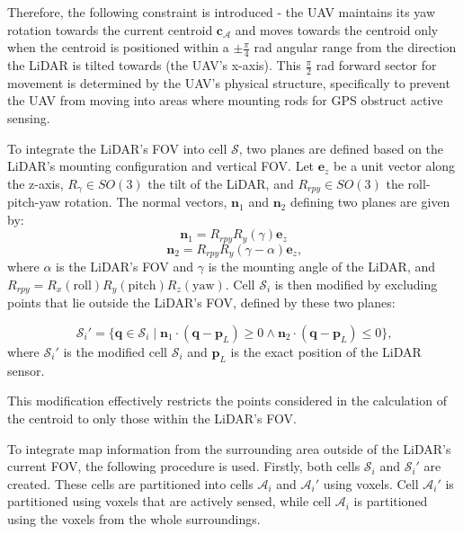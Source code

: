             Therefore, the following constraint is introduced - the \ac{UAV} maintains its yaw rotation towards the current centroid $\mathbf{c}_{\mathcal{A}}$ and moves towards the centroid only when the centroid is positioned within a $\pm \frac{\pi}{4}$ rad angular range from the direction the \ac{LiDAR} is tilted towards (the \ac{UAV}'s x-axis).
            This $\frac{\pi}{2}$ rad forward sector for movement is determined by the \ac{UAV}'s physical structure, specifically to prevent the \ac{UAV} from moving into areas where mounting rods for \ac{GPS} obstruct active sensing.

            To integrate the \ac{LiDAR}'s \ac{FOV} into cell $\mathcal{S}$, two planes are defined based on the \ac{LiDAR}'s mounting configuration and vertical \ac{FOV}.
            Let $\mathbf{e}_z$ be a unit vector along the z-axis, $R_{\gamma} \in SO(3)$ the tilt of the \ac{LiDAR}, and $R_{rpy} \in SO(3)$ the roll-pitch-yaw rotation.
            The normal vectors, $\mathbf{n}_1$ and $\mathbf{n}_2$ defining two planes are given by:
            \begin{equation}
                \mathbf{n}_1 = R_{rpy} R_{y}(\gamma)  \mathbf{e}_z    
            \end{equation}
            \begin{equation}
                \mathbf{n}_2 = R_{rpy} R_{y}(\gamma - \alpha) \mathbf{e}_z  \text{,}
            \end{equation}
            where $\alpha$ is the \ac{LiDAR}'s \ac{FOV} and $\gamma$ is the mounting angle of the \ac{LiDAR}, and $R_{rpy} = R_x(\text{roll})R_y(\text{pitch})R_z(\text{yaw})$.
            Cell $\mathcal{S}_i$ is then modified by excluding points that lie outside the \ac{LiDAR}'s \ac{FOV}, defined by these two planes: 

            \begin{equation}
                \mathcal{S}_i' = \{ \mathbf{q} \in \mathcal{S}_i \mid \mathbf{n}_1 \cdot (\mathbf{q} - \mathbf{p}_{L}) \geq 0 \land \mathbf{n}_2 \cdot (\mathbf{q} - \mathbf{p}_{L}) \leq 0 \}\text{,}
            \end{equation}
            where $\mathcal{S}_i'$ is the modified cell $\mathcal{S}_i$ and $\mathbf{p}_{L}$ is the exact position of the LiDAR sensor.

            This modification effectively restricts the points considered in the calculation of the centroid to only those within the \ac{LiDAR}'s \ac{FOV}.

            To integrate map information from the surrounding area outside of the \ac{LiDAR}'s current \ac{FOV}, the following procedure is used.
            Firstly, both cells $\mathcal{S}_i$ and $\mathcal{S}_i'$ are created. These cells are partitioned into cells $\mathcal{A}_i$ and $\mathcal{A}_i'$ using voxels. 
            Cell $\mathcal{A}_i'$ is partitioned using voxels that are actively sensed, while cell $\mathcal{A}_i$ is partitioned using the voxels from the whole surroundings.

